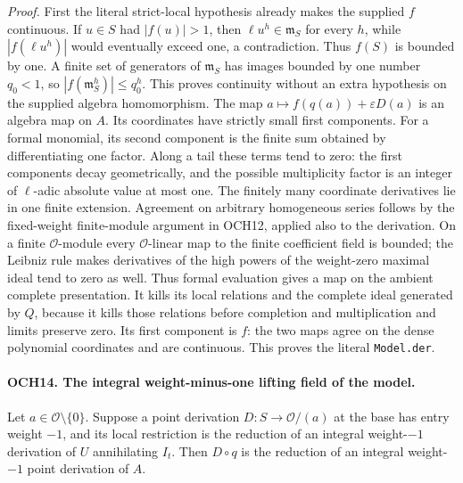 \emph{Proof.}
First the literal strict-local hypothesis already makes the supplied
\(f\) continuous.  If \(u\in S\) had \(|f(u)|>1\),
then \(\ell u^h\in\mathfrak m_S\) for every \(h\),
while \(|f(\ell u^h)|\) would eventually exceed one, a
contradiction.  Thus \(f(S)\) is bounded by one.  A finite
set of generators of \(\mathfrak m_S\) has images bounded
by one number \(q_0<1\), so
\(|f(\mathfrak m_S^h)|\le q_0^h\).  This proves continuity
without an extra hypothesis on the supplied algebra homomorphism.
The map \(a\mapsto f(q(a))+\varepsilon D(a)\) is an algebra
map on \(A\).  Its coordinates have strictly small first
components.  For a formal monomial, its second component is the
finite sum obtained by differentiating one factor.  Along a tail
these terms tend to zero: the first components decay geometrically,
and the possible multiplicity factor is an integer of
\(\ell\)-adic absolute value at most one.  The finitely many
coordinate derivatives lie in one finite extension.
Agreement on arbitrary homogeneous series follows by the fixed-weight
finite-module argument in OCH12, applied also to the derivation.
On a finite \(\mathcal O\)-module every \(\mathcal O\)-linear
map to the finite coefficient field is bounded; the Leibniz rule
makes derivatives of the high powers of the weight-zero maximal
ideal tend to zero as well.  Thus formal evaluation gives a map
on the ambient complete presentation.  It kills its local relations
and the complete ideal generated by \(Q\), because it kills
those relations before completion and multiplication and limits
preserve zero.  Its first component is \(f\): the two maps
agree on the dense polynomial coordinates and are continuous.
This proves the literal \texttt{Model.der}.

\paragraph{OCH14. The integral weight-minus-one lifting field of the model.}
\label{claim:OCH14}
Let \(a\in\mathcal O\setminus\{0\}\).  Suppose a point
derivation \(D:S\to\mathcal O/(a)\) at the base has entry
weight \(-1\), and its local restriction is the reduction of an
integral weight-\(-1\) derivation of \(U\) annihilating
\(I_t\).  Then \(D\circ q\) is the reduction of an integral
weight-\(-1\) point derivation of \(A\).

